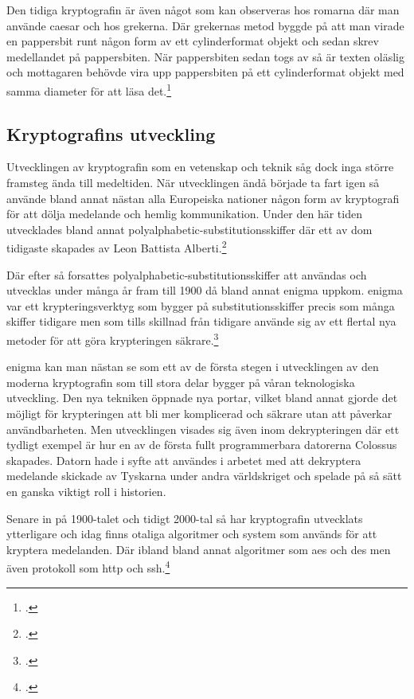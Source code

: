 Den tidiga kryptografin är även något som kan observeras hos romarna där
man använde \gls{caesar} och hos grekerna. Där grekernas metod byggde på
att man virade en pappersbit runt någon form av ett cylinderformat objekt
och sedan skrev medellandet på pappersbiten. När pappersbiten sedan togs av så är texten %
oläslig och mottagaren behövde vira upp pappersbiten på ett cylinderformat objekt
med samma diameter för att läsa det.\footcite{kryptografi-historia-1}

\subsection{Kryptografins utveckling} %
Utvecklingen av kryptografin som en vetenskap och teknik såg dock inga större framsteg
ända till medeltiden. När utvecklingen ändå började ta fart igen så använde bland annat
nästan alla Europeiska nationer någon form av kryptografi för att dölja medelande och hemlig kommunikation.
Under den här tiden utvecklades bland annat \gls{polyalphabetic-substitutionsskiffer} där ett av dom tidigaste skapades av
Leon Battista Alberti.\footcite{kryptografi-historia-1}

Där efter så forsattes \gls{polyalphabetic-substitutionsskiffer} att användas och utvecklas
under många år fram till 1900 då bland annat \gls{enigma} uppkom. \gls{enigma} var ett krypteringsverktyg som
bygger på \gls{substitutionsskiffer} precis som många skiffer tidigare men som tills skillnad från tidigare
använde sig av ett flertal nya metoder för att göra krypteringen säkrare.\footcite{kryptografi-historia-1}

\gls{enigma} kan man nästan se som ett av de första stegen i utvecklingen av den moderna kryptografin som
till stora delar bygger på våran teknologiska utveckling. Den nya tekniken öppnade nya portar, vilket bland annat gjorde det möjligt
för krypteringen att bli mer komplicerad och säkrare utan att påverkar användbarheten. Men utvecklingen visades sig även inom
dekrypteringen där ett tydligt exempel är hur en av de första fullt programmerbara datorerna Colossus skapades. Datorn hade i syfte
att användes i arbetet med att dekryptera medelande skickade av Tyskarna under andra världskriget och spelade på så sätt
en ganska viktigt roll i historien.

Senare in på 1900-talet och tidigt 2000-tal så har kryptografin utvecklats ytterligare och idag finns otaliga
algoritmer och system som används för att kryptera medelanden. Där ibland bland annat algoritmer som \gls{aes} och \gls{des} men även
protokoll som \gls{http} och \gls{ssh}.\footcite{krypto}

